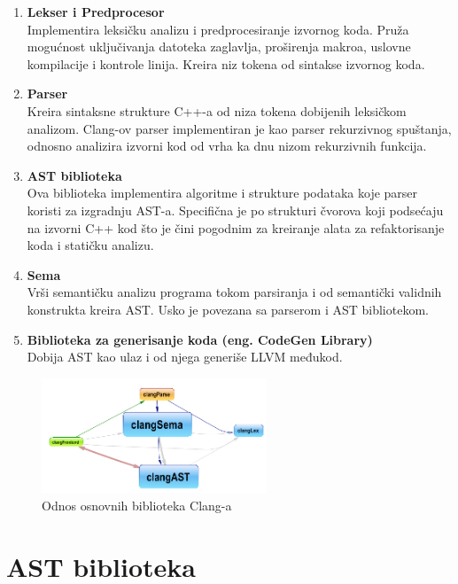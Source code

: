 \documentclass[12pt,oneside]{memoir}
\begin{document}
\begin{enumerate}
  \item{\textbf{Lekser i Predprocesor} \\
       Implementira leksičku analizu i predprocesiranje izvornog koda.
       Pruža mogućnost uključivanja datoteka zaglavlja, proširenja makroa, uslovne kompilacije i kontrole linija. 
       Kreira niz tokena od sintakse izvornog koda.}
  \item{\textbf{Parser} \\
        Kreira sintaksne strukture C++-a od niza tokena dobijenih leksičkom analizom.
        Clang-ov parser implementiran je kao parser rekurzivnog spuštanja, odnosno analizira izvorni kod od vrha ka dnu nizom rekurzivnih funkcija.}
  \item{\textbf{AST biblioteka} \\
        Ova biblioteka implementira algoritme i strukture podataka koje parser koristi za izgradnju AST-a. Specifična je po strukturi čvorova koji podsećaju na izvorni C++ kod što je čini pogodnim za kreiranje alata za refaktorisanje koda i statičku analizu.}
  \item{\textbf{Sema} \\
        Vrši semantičku analizu programa tokom parsiranja i od semantički validnih konstrukta kreira AST. Usko je povezana sa parserom i AST bibliotekom.}
  \item{\textbf{Biblioteka za generisanje koda (eng. CodeGen Library)} \\
        Dobija AST kao ulaz i od njega generiše LLVM međukod.}

\end{enumerate}

\begin{figure}[!ht]
  \centering
  \includegraphics[width=0.6\textwidth]{ClangBiblioteke.png}
  \caption{Odnos osnovnih biblioteka Clang-a}
  \label{fig:grafikon}
\end{figure}

\section{AST biblioteka}
\end{document}
